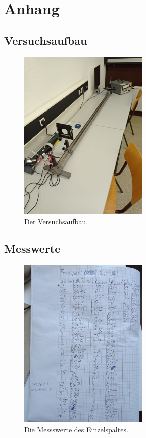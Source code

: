\newpage
\section{Anhang}
\subsection{Versuchsaufbau}

    \begin{figure}[h]
        \centering
        \includegraphics[width=0.55\textwidth]{latex/images/aufbau.jpeg}
        \caption{Der Versuchsaufbau.}
        \label{img:mess1}
    \end{figure}
\newpage
\subsection{Messwerte}

    \begin{figure}[h]
        \centering
        \includegraphics[width=0.55\textwidth]{latex/images/messeinz.jpeg}
        \caption{Die Messswerte des Einzelspaltes.}
        \label{img:mess1}
    \end{figure}

